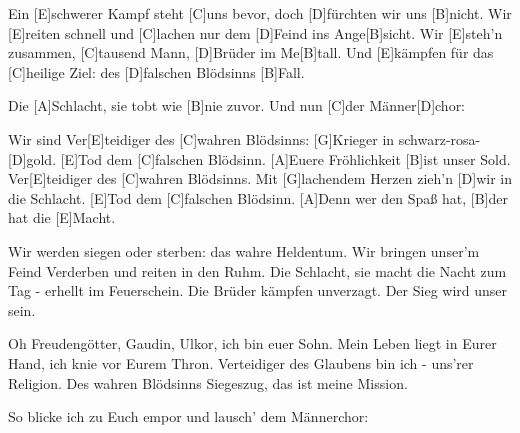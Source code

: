 

\begin{guitar}
	Ein [E]schwerer Kampf steht [C]uns bevor, doch [D]fürchten wir uns [B]nicht.
	Wir [E]reiten schnell und [C]lachen nur dem [D]Feind ins Ange[B]sicht.
	Wir [E]steh'n zusammen, [C]tausend Mann, [D]Brüder im Me[B]tall.
	Und [E]kämpfen für das [C]heilige Ziel: des [D]falschen Blödsinns [B]Fall.
	
	Die [A]Schlacht, sie tobt wie [B]nie zuvor. Und nun [C]der Männer[D]chor:
	
	Wir sind Ver[E]teidiger des [C]wahren Blödsinns: [G]Krieger in schwarz-rosa-[D]gold.
	[E]Tod dem [C]falschen Blödsinn. [A]Euere Fröhlichkeit [B]ist unser Sold.
	Ver[E]teidiger des [C]wahren Blödsinns. Mit [G]lachendem Herzen zieh'n [D]wir in die Schlacht.
	[E]Tod dem [C]falschen Blödsinn. [A]Denn wer den Spaß hat, [B]der hat die [E]Macht.
	
	Wir werden siegen oder sterben: das wahre Heldentum.
	Wir bringen unser'm Feind Verderben und reiten in den Ruhm.
	Die Schlacht, sie macht die Nacht zum Tag - erhellt im Feuerschein.
	Die Brüder kämpfen unverzagt. Der Sieg wird unser sein.
	
	 
	
	 
	
	Oh Freudengötter, Gaudin, Ulkor, ich bin euer Sohn.
	Mein Leben liegt in Eurer Hand, ich knie vor Eurem Thron.
	Verteidiger des Glaubens bin ich - uns'rer Religion.
	Des wahren Blödsinns Siegeszug, das ist meine Mission.
	
	So blicke ich zu Euch empor und lausch' dem Männerchor:
	
	 
\end{guitar}